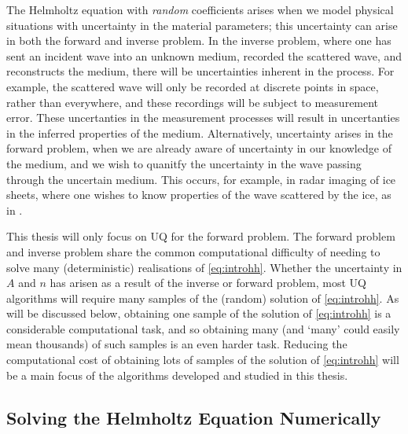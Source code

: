 The Helmholtz equation with \emph{random} coefficients arises when we model physical situations with uncertainty in the material parameters; this uncertainty can arise in both the forward and inverse problem. In the inverse problem, where one has sent an incident wave into an unknown medium, recorded the scattered wave, and reconstructs the medium, there will be uncertainties inherent in the process. For example, the scattered wave will only be recorded at discrete points in space, rather than everywhere, and these recordings will be subject to measurement error. These uncertanties in the measurement processes will result in uncertanties in the inferred properties of the medium. Alternatively, uncertainty arises in the forward problem, when we are already aware of uncertainty in our knowledge of the medium, and we wish to quanitfy the uncertainty in the wave passing through the uncertain medium. This occurs, for example, in radar imaging of ice sheets, where one wishes to know properties of the wave scattered by the ice, as in \cite{JiPi:18}.

This thesis will only focus on UQ for the forward problem. The forward problem and inverse problem share the common computational difficulty of needing to solve many (deterministic) realisations of \eqref{eq:introhh}. Whether the uncertainty in $A$ and $n$ has arisen as a result of the inverse or forward problem, most UQ algorithms will require many samples of the (random) solution of \eqref{eq:introhh}. As will be discussed below, obtaining one sample of the solution of \eqref{eq:introhh} is a considerable computational task, and so obtaining many (and `many' could easily mean thousands) of such samples is an even harder task. Reducing the computational cost of obtaining lots of samples of the solution of \eqref{eq:introhh} will be a main focus of the algorithms developed and studied in this thesis. %

\subsection{Solving the Helmholtz Equation Numerically}\label{sec:numsolve}

